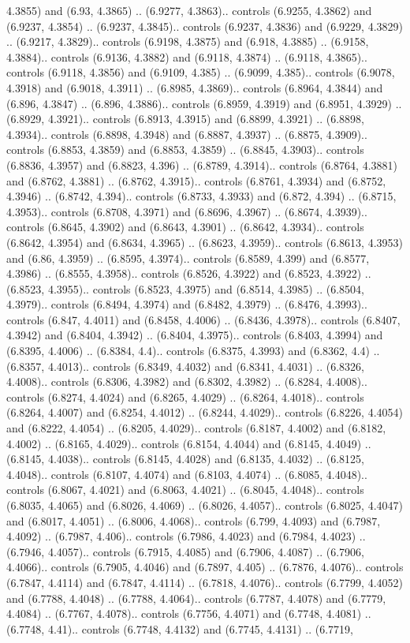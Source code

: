 4.3855) and (6.93, 4.3865) .. (6.9277, 4.3863).. controls (6.9255, 4.3862) and (6.9237, 4.3854) .. (6.9237, 4.3845).. controls (6.9237, 4.3836) and (6.9229, 4.3829) .. (6.9217, 4.3829).. controls (6.9198, 4.3875) and (6.918, 4.3885) .. (6.9158, 4.3884).. controls (6.9136, 4.3882) and (6.9118, 4.3874) .. (6.9118, 4.3865).. controls (6.9118, 4.3856) and (6.9109, 4.385) .. (6.9099, 4.385).. controls (6.9078, 4.3918) and (6.9018, 4.3911) .. (6.8985, 4.3869).. controls (6.8964, 4.3844) and (6.896, 4.3847) .. (6.896, 4.3886).. controls (6.8959, 4.3919) and (6.8951, 4.3929) .. (6.8929, 4.3921).. controls (6.8913, 4.3915) and (6.8899, 4.3921) .. (6.8898, 4.3934).. controls (6.8898, 4.3948) and (6.8887, 4.3937) .. (6.8875, 4.3909).. controls (6.8853, 4.3859) and (6.8853, 4.3859) .. (6.8845, 4.3903).. controls (6.8836, 4.3957) and (6.8823, 4.396) .. (6.8789, 4.3914).. controls (6.8764, 4.3881) and (6.8762, 4.3881) .. (6.8762, 4.3915).. controls (6.8761, 4.3934) and (6.8752, 4.3946) .. (6.8742, 4.394).. controls (6.8733, 4.3933) and (6.872, 4.394) .. (6.8715, 4.3953).. controls (6.8708, 4.3971) and (6.8696, 4.3967) .. (6.8674, 4.3939).. controls (6.8645, 4.3902) and (6.8643, 4.3901) .. (6.8642, 4.3934).. controls (6.8642, 4.3954) and (6.8634, 4.3965) .. (6.8623, 4.3959).. controls (6.8613, 4.3953) and (6.86, 4.3959) .. (6.8595, 4.3974).. controls (6.8589, 4.399) and (6.8577, 4.3986) .. (6.8555, 4.3958).. controls (6.8526, 4.3922) and (6.8523, 4.3922) .. (6.8523, 4.3955).. controls (6.8523, 4.3975) and (6.8514, 4.3985) .. (6.8504, 4.3979).. controls (6.8494, 4.3974) and (6.8482, 4.3979) .. (6.8476, 4.3993).. controls (6.847, 4.4011) and (6.8458, 4.4006) .. (6.8436, 4.3978).. controls (6.8407, 4.3942) and (6.8404, 4.3942) .. (6.8404, 4.3975).. controls (6.8403, 4.3994) and (6.8395, 4.4006) .. (6.8384, 4.4).. controls (6.8375, 4.3993) and (6.8362, 4.4) .. (6.8357, 4.4013).. controls (6.8349, 4.4032) and (6.8341, 4.4031) .. (6.8326, 4.4008).. controls (6.8306, 4.3982) and (6.8302, 4.3982) .. (6.8284, 4.4008).. controls (6.8274, 4.4024) and (6.8265, 4.4029) .. (6.8264, 4.4018).. controls (6.8264, 4.4007) and (6.8254, 4.4012) .. (6.8244, 4.4029).. controls (6.8226, 4.4054) and (6.8222, 4.4054) .. (6.8205, 4.4029).. controls (6.8187, 4.4002) and (6.8182, 4.4002) .. (6.8165, 4.4029).. controls (6.8154, 4.4044) and (6.8145, 4.4049) .. (6.8145, 4.4038).. controls (6.8145, 4.4028) and (6.8135, 4.4032) .. (6.8125, 4.4048).. controls (6.8107, 4.4074) and (6.8103, 4.4074) .. (6.8085, 4.4048).. controls (6.8067, 4.4021) and (6.8063, 4.4021) .. (6.8045, 4.4048).. controls (6.8035, 4.4065) and (6.8026, 4.4069) .. (6.8026, 4.4057).. controls (6.8025, 4.4047) and (6.8017, 4.4051) .. (6.8006, 4.4068).. controls (6.799, 4.4093) and (6.7987, 4.4092) .. (6.7987, 4.406).. controls (6.7986, 4.4023) and (6.7984, 4.4023) .. (6.7946, 4.4057).. controls (6.7915, 4.4085) and (6.7906, 4.4087) .. (6.7906, 4.4066).. controls (6.7905, 4.4046) and (6.7897, 4.405) .. (6.7876, 4.4076).. controls (6.7847, 4.4114) and (6.7847, 4.4114) .. (6.7818, 4.4076).. controls (6.7799, 4.4052) and (6.7788, 4.4048) .. (6.7788, 4.4064).. controls (6.7787, 4.4078) and (6.7779, 4.4084) .. (6.7767, 4.4078).. controls (6.7756, 4.4071) and (6.7748, 4.4081) .. (6.7748, 4.41).. controls (6.7748, 4.4132) and (6.7745, 4.4131) .. (6.7719, 